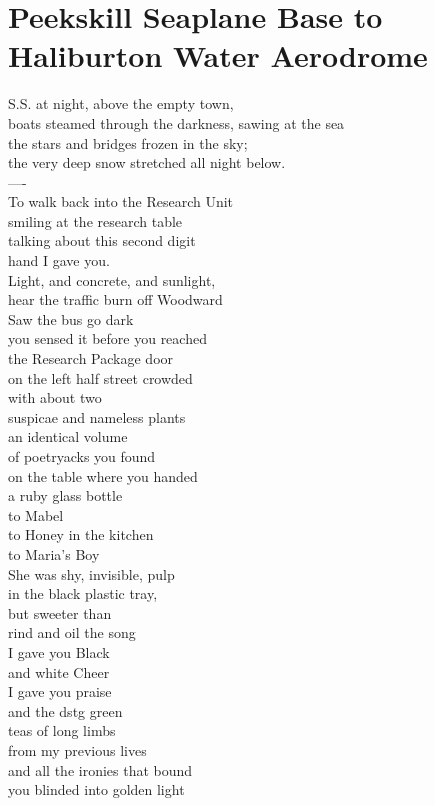 \documentclass[smalldemyvopaper,11pt,twoside,onecolumn,openright,extrafontsizes]{memoir}
\begin{document}
\chapter{Peekskill Seaplane Base to Haliburton Water Aerodrome}
S.S. at night, above the empty town,
\\boats steamed through the darkness, sawing at the sea
\\the stars and bridges frozen in the sky;
\\the very deep snow stretched all night below.
\\----
\\To walk back into the Research Unit
\\smiling at the research table
\\talking about this second digit
\\hand I gave you.
\\Light, and concrete, and sunlight,
\\hear the traffic burn off Woodward
\\Saw the bus go dark
\\you sensed it before you reached
\\the Research Package door
\\on the left half street crowded
\\with about two
\\suspicae and nameless plants
\\an identical volume
\\of poetryacks you found
\\on the table where you handed
\\a ruby glass bottle
\\to Mabel
\\to Honey in the kitchen
\\to Maria's Boy
\\She was shy, invisible, pulp
\\in the black plastic tray,
\\but sweeter than
\\rind and oil the song
\\I gave you Black
\\and white Cheer
\\I gave you praise
\\and the dstg green
\\teas of long limbs
\\from my previous lives
\\and all the ironies that bound
\\you blinded into golden light
\end{document}
